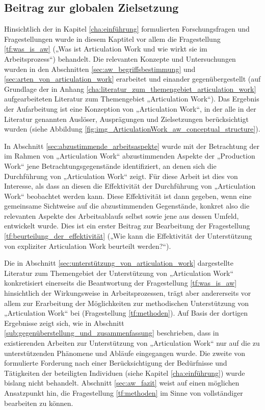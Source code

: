 \subsection{Beitrag zur globalen Zielsetzung}

Hinsichtlich der in Kapitel \ref{cha:einführung} formulierten Forschungsfragen und Fragestellungen wurde in diesem Kaptitel vor allem die Fragestellung \ref{tf:was_is_aw} („Was ist Articulation Work und wie wirkt sie im Arbeitsprozess“) behandelt. Die relevanten Konzepte und Untersuchungen wurden in den Abschnitten \ref{sec:aw_begriffsbestimmung} und \ref{sec:arten_von_articulation_work} erarbeitet und einander gegenübergestellt (auf Grundlage der in Anhang \ref{cha:literatur_zum_themengebiet_articulation_work} aufgearbeiteten Literatur zum Themengebiet „Articulation Work“). Das Ergebnis der Aufarbeitung ist eine Konzeption von „Articulation Work“, in der alle in der Literatur genannten Auslöser, Ausprägungen und Zielsetzungen berücksichtigt wurden (siehe Abbildung \ref{fig:img_ArticulationWork_aw_conceptual_structure}). 

In Abschnitt \ref{sec:abzustimmende_arbeitsaspekte} wurde mit der Betrachtung der im Rahmen von „Articulation Work“ abzustimmenden Aspekte der „Production Work“ jene Betrachtungsgegenstände identifiziert, an denen sich die Durchführung von „Articulation Work“ zeigt. Für diese Arbeit ist dies von Interesse, als dass an diesen die Effektivität der Durchführung von „Articulation Work“ beobachtet werden kann. Diese Effektivität ist dann gegeben, wenn eine gemeinsame Sichtweise auf die abzustimmenden Gegenstände, konkret also die relevanten Aspekte des Arbeitsablaufs selbst sowie jene aus dessen Umfeld, entwickelt wurde. Dies ist ein erster Beitrag zur Bearbeitung der Fragestellung \ref{tf:beurteilung_der_effektivität} („Wie kann die Effektivität der Unterstützung von expliziter Articulation Work beurteilt werden?“).

Die in Abschnitt \ref{sec:unterstützung_von_articulation_work} dargestellte Literatur zum Themengebiet der Unterstützung von „Articulation Work“ konkretisiert einerseits die Beantwortung der Fragestellung \ref{tf:was_is_aw} hinsichtlich der Wirkungsweise in Arbeitsprozessen, trägt aber andererseits vor allem zur Erarbeitung der Möglichkeiten zur methodischen Unterstützung von „Articulation Work“ bei (Fragestellung \ref{tf:methoden}). Auf Basis der dortigen Ergebnisse zeigt sich, wie in Abschnitt \ref{sub:gegenüberstellung_und_zusammenfassung} beschrieben, dass in existierenden Arbeiten zur Unterstützung von „Articulation Work“ nur auf die zu unterstützenden Phänomene und Abläufe eingegangen wurde. Die zweite von \citet{Grudin88} formulierte Forderung nach einer Berücksichtigung der Bedürfnisse und Tätigkeiten der beteiligten Individuen (siehe Kapitel \ref{cha:einführung}) wurde bislang nicht behandelt. Abschnitt \ref{sec:aw_fazit} weist auf einen möglichen Ansatzpunkt hin, die Fragestellung \ref{tf:methoden} im Sinne von \citet{Grudin88} vollständiger bearbeiten zu können.

